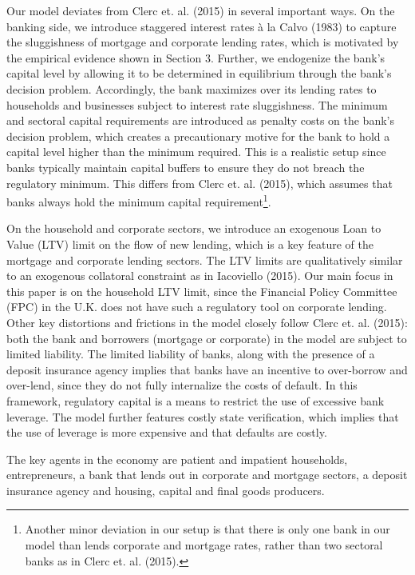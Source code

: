 \documentclass[12pt]{article}
\numberwithin{equation}{section}
\begin{document}
Our model deviates from Clerc et. al. (2015) in several important ways. On the banking side, we introduce staggered interest rates à la Calvo (1983) to capture the sluggishness of mortgage and corporate lending rates, which is motivated by the empirical evidence shown in Section 3. Further, we endogenize the bank's capital level by allowing it to be determined in equilibrium through the bank's decision problem. Accordingly, the bank maximizes over its lending rates to households and businesses subject to interest rate sluggishness. The minimum and sectoral capital requirements are introduced as penalty costs on the bank's decision problem, which creates a precautionary motive for the bank to hold a capital level higher than the minimum required. This is a realistic setup since banks typically maintain capital buffers to ensure they do not breach the regulatory minimum. This differs from Clerc et. al. (2015), which assumes that banks always hold the minimum capital requirement\footnote{Another minor deviation in our setup is that there is only one bank in our model than lends corporate and mortgage rates, rather than two sectoral banks as in Clerc et. al. (2015).}. 

On the household and corporate sectors, we introduce an exogenous Loan to Value (LTV) limit on the flow of new lending, which is a key feature of the mortgage and corporate lending sectors. The LTV limits are qualitatively similar to an exogenous collatoral constraint as in Iacoviello (2015). Our main focus in this paper is on the household LTV limit, since the Financial Policy Committee (FPC) in the U.K. does not have such a regulatory tool on corporate lending. Other key distortions and frictions in the model closely follow Clerc et. al. (2015): both the bank and borrowers (mortgage or corporate) in the model are subject to limited liability. The limited liability of banks, along with the presence of a deposit insurance agency implies that banks have an incentive to over-borrow and over-lend, since they do not fully internalize the costs of default. In this framework, regulatory capital is a means to restrict the use of excessive bank leverage. The model further features costly state verification, which implies that the use of leverage is more expensive and that defaults are costly. 

The key agents in the economy are patient and impatient households, entrepreneurs, a bank that lends out in corporate and mortgage sectors, a deposit insurance agency and housing, capital and final goods producers. 
\end{document}
